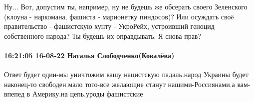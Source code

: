 Ну... Вот, допустим ты, например, ну не будешь же обсерать своего Зеленского (клоуна - наркомана, фашиста - марионетку пиндосов)?
Или осуждать своë правительство - фашистскую хунту - УкроРейх, устроивший геноцид собственного народа?
Ты будешь их оправдывать.
Я снова прав?

\paragraph{16:21:05 16-08-22 Наталья Слободченко(Ковалёва)}

Ответ будет один-мы уничтожим вашу нацистскую падаль.народ Украины будет
наконец-то свободен.мало того-все желающие станут нашими-Россиянами.а
вам-впепед в Америку.на цепь.уроды фашистские
